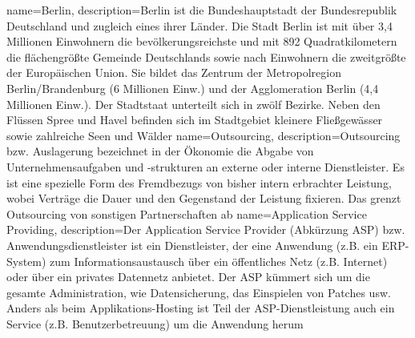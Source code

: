      {
        name={Berlin},
        description={Berlin ist die Bundeshauptstadt der Bundesrepublik Deutschland und zugleich eines ihrer Länder. Die Stadt Berlin ist mit über 3,4 Millionen Einwohnern die bevölkerungsreichste und mit 892 Quadratkilometern die flächengrößte Gemeinde Deutschlands sowie nach Einwohnern die zweitgrößte der Europäischen Union. Sie bildet das Zentrum der Metropolregion Berlin/Brandenburg (6 Millionen Einw.) und der Agglomeration Berlin (4,4 Millionen Einw.). Der Stadtstaat unterteilt sich in zwölf Bezirke. Neben den Flüssen Spree und Havel befinden sich im Stadtgebiet kleinere Fließgewässer sowie zahlreiche Seen und Wälder}
        }
     {
        name={Outsourcing},
        description={Outsourcing bzw. Auslagerung bezeichnet in der Ökonomie die Abgabe von Unternehmensaufgaben und -strukturen an externe oder interne Dienstleister. Es ist eine spezielle Form des Fremdbezugs von bisher intern erbrachter Leistung, wobei Verträge die Dauer und den Gegenstand der Leistung fixieren. Das grenzt Outsourcing von sonstigen Partnerschaften ab}
        }
     {
        name={Application Service Providing},
        description={Der Application Service Provider (Abkürzung ASP) bzw. Anwendungsdienstleister ist ein Dienstleister, der eine Anwendung (z.B. ein ERP-System) zum Informationsaustausch über ein öffentliches Netz (z.B. Internet) oder über ein privates Datennetz anbietet. Der ASP kümmert sich um die gesamte Administration, wie Datensicherung, das Einspielen von Patches usw. Anders als beim Applikations-Hosting ist Teil der ASP-Dienstleistung auch ein Service (z.B. Benutzerbetreuung) um die Anwendung herum}
        }
